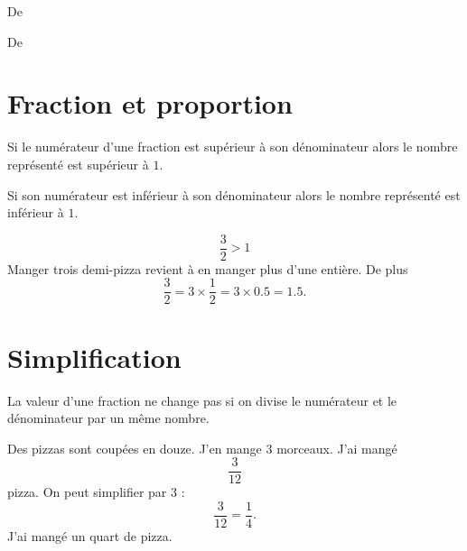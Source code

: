 

De \cite{NRHooXFvgpp5}


De \cite{NRHooXFvgpp5}

\section{Fraction et proportion}

\begin{Aretenir}
Si le numérateur d'une fraction est supérieur à son dénominateur alors le nombre représenté est supérieur à $1$.

Si son numérateur est inférieur à son dénominateur alors le nombre représenté est inférieur à $1$.
\end{Aretenir}

\begin{example}
    \begin{equation}
        \frac{ 3 }{ 2 }>1
    \end{equation}
    Manger trois demi-pizza revient à en manger plus d'une entière. De plus
    \begin{equation}
        \frac{ 3 }{ 2 }=3\times \frac{ 1 }{2}=3\times 0.5=1.5.
    \end{equation}
\end{example}

\section{Simplification}

\begin{Aretenir}
    La valeur d'une fraction ne change pas si on divise le numérateur et le dénominateur par un même nombre.
\end{Aretenir}

\begin{example}
    Des pizzas sont coupées en douze. J'en mange \( 3\) morceaux. J'ai mangé
    \begin{equation}
        \frac{ 3 }{ 12 }
    \end{equation}
    pizza. On peut simplifier par \( 3\) :
    \begin{equation}
        \frac{ 3 }{ 12 }=\frac{1}{ 4 }.
    \end{equation}
    J'ai mangé un quart de pizza.
\end{example}

